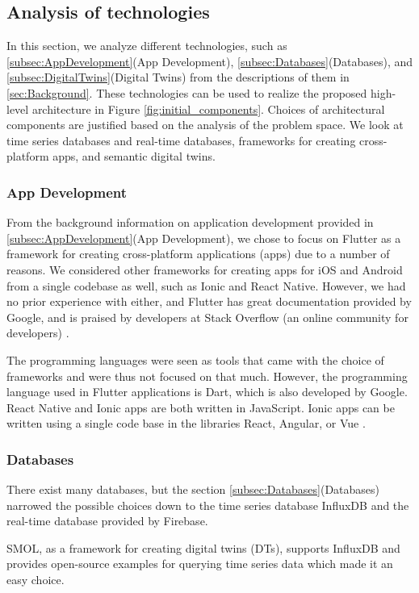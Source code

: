 \documentclass{article}
\begin{document}
\subsection{Analysis of technologies}
In this section, we analyze different technologies, such as \ref{subsec:AppDevelopment}(App Development), \ref{subsec:Databases}(Databases), and \ref{subsec:DigitalTwins}(Digital Twins) from the descriptions of them in \ref{sec:Background}. These technologies can be used to realize the proposed high-level architecture in Figure \ref{fig:initial_components}. Choices of architectural components are justified based on the analysis of the problem space. We look at time series databases and real-time databases, frameworks for creating cross-platform apps, and semantic digital twins.

\subsubsection{App Development}\label{subsubsection:AppDevelopment}
From the background information on application development provided in \ref{subsec:AppDevelopment}(App Development), we chose to focus on Flutter as a framework for creating cross-platform applications (apps) due to a number of reasons. We considered other frameworks for creating apps for iOS and Android from a single codebase as well, such as Ionic and React Native. However, we had no prior experience with either, and Flutter has great documentation provided by Google, and is praised by developers at Stack Overflow (an online community for developers) \cite{noauthor_why_nodate}.

The programming languages were seen as tools that came with the choice of frameworks and were thus not focused on that much. However, the programming language used in Flutter applications is Dart, which is also developed by Google. React Native and Ionic apps are both written in JavaScript. Ionic apps can be written using a single code base in the libraries React, Angular, or Vue \cite{noauthor_ionic_nodate}.

\subsubsection{Databases}\label{subsubsection:Databases}
There exist many databases, but the section \ref{subsec:Databases}(Databases) narrowed the possible choices down to the time series database InfluxDB and the real-time database provided by Firebase. 

SMOL, as a framework for creating digital twins (DTs), supports InfluxDB and provides open-source examples for querying time series data which made it an easy choice. 
\end{document}
